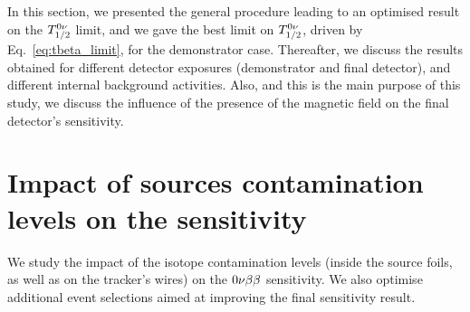 
In this section, we presented the general procedure leading to an optimised result on the $T_{1/2}^{0\nu}$ limit, and we gave the best limit on $T_{1/2}^{0\nu}$, driven by Eq.~\eqref{eq:tbeta_limit}, for the demonstrator case.
Thereafter, we discuss the results obtained for different detector exposures (demonstrator and final detector), and different internal background activities.
Also, and this is the main purpose of this study, we discuss the influence of the presence of the magnetic field on the final detector's sensitivity.


\section{Impact of sources contamination levels on the sensitivity}
\label{sec:demonstrator_sensitivity}

We study the impact of the isotope contamination levels (inside the source foils, as well as on the tracker's wires) on the $0\nu\beta\beta$ sensitivity.
We also optimise additional event selections aimed at improving the final sensitivity result.


